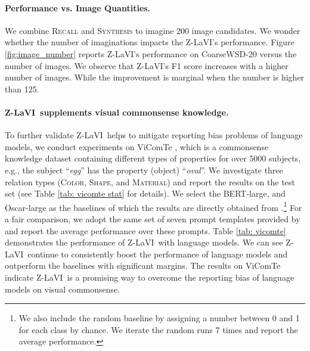 \documentclass[11pt]{article}
\newcommand{\model}{Z-LaVI}
\begin{document}
\paragraph{Performance vs. Image Quantities.} We combine \textsc{Recall} and \textsc{Synthesis} to imagine 200 image candidates. We wonder whether the number of imaginations impacts the \model's performance. Figure \ref{fig:image_number}
 reports \model's performance on CoarseWSD-20 versus the number of images. We observe that \model’s F1 score increases with a higher number of images. While the improvement is marginal when the number is higher than 125.


\paragraph{\model~supplements visual commonsense knowledge.} To further validate \model~helps to mitigate reporting bias problems of language models, we conduct experiments on ViComTe \cite{zhang-etal-2022-visual}, which is a commonsense knowledge dataset containing different types of properties for over 5000 subjects, e.g., the subject ``\textit{egg}'' has the property (object) ``\textit{oval}''. We investigate three relation types (\textsc{Color}, \textsc{Shape}, and \textsc{Material}) and report the results on the test set (see Table \ref{tab: vicomte stat} for details). We select the BERT-large, and Oscar-large \cite{li2020oscar} as the baselines of which the results are directly obtained from \citet{zhang-etal-2022-visual}.\footnote{We also include the random baseline by assigning a number between 0 and 1 for each class by chance. We iterate the random runs 7 times and report the average performance.} For a fair comparison, we adopt the same set of seven prompt templates provided by \citet{zhang-etal-2022-visual} and report the average performance over these prompts. Table \ref{tab: vicomte} demonstrates the performance of \model~with language models. We can see \model~continue to consistently boost the performance of language models and outperform the baselines with significant margins. The results on ViComTe indicate \model~is a promising way to overcome the reporting bias of language models on visual commonsense. 

\begin{table}[!t]
\centering
\centering
{}
\caption{Statistics of ViComTe dataset.}
\label{tab: vicomte stat}
\vspace{-.2cm}
\end{table} 
\end{document}

